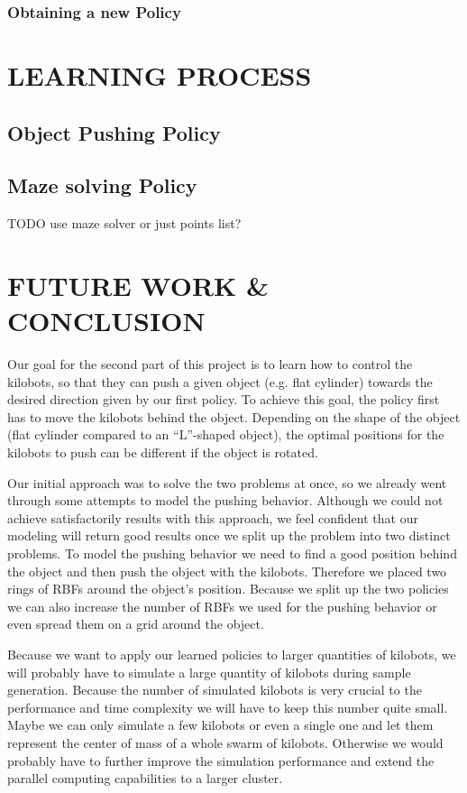 \documentclass[twoside]{article}
\begin{document}
\subsubsection{Obtaining a new Policy}

\section{LEARNING PROCESS}

\subsection{Object Pushing Policy}

\subsection{Maze solving Policy}

TODO use maze solver or just points list?

\section{FUTURE WORK \& CONCLUSION} Our goal for the second part of this project
is to learn how to control the kilobots, so that they can push a given object
(e.g. flat cylinder) towards the desired direction given by our first policy. To
achieve this goal, the policy first has to move the kilobots behind the object.
Depending on the shape of the object (flat cylinder compared to an ``L''-shaped
object), the optimal positions for the kilobots to push can be different if the
object is rotated.

Our initial approach was to solve the two problems at once, so we already went
through some attempts to model the pushing behavior. Although we could not
achieve satisfactorily results with this approach, we feel confident that our
modeling will return good results once we split up the problem into two distinct
problems. To model the pushing behavior we need to find a good position behind
the object and then push the object with the kilobots. Therefore we placed two
rings of RBFs around the object's position. Because we split up the two policies
we can also increase the number of RBFs we used for the pushing behavior or even
spread them on a grid around the object.

Because we want to apply our learned policies to larger quantities of kilobots,
we will probably have to simulate a large quantity of kilobots during sample
generation. Because the number of simulated kilobots is very crucial to the
performance and time complexity we will have to keep this number quite small.
Maybe we can only simulate a few kilobots or even a single one and let them
represent the center of mass of a whole swarm of kilobots. Otherwise we would
probably have to further improve the simulation performance and extend the
parallel computing capabilities to a larger cluster.
\end{document}
